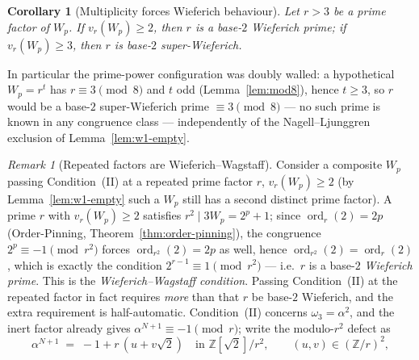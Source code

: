 \documentclass[11pt]{amsart}
\theoremstyle{plain}
\newtheorem{corollary}[theorem]{Corollary}
\theoremstyle{definition}
\theoremstyle{remark}
\newtheorem{remark}[theorem]{Remark}
\numberwithin{equation}{section}
\newcommand{\ord}{\operatorname{ord}}
\newcommand{\Z}{\mathbb{Z}}
\begin{document}
\begin{corollary}[Multiplicity forces Wieferich behaviour]\label{cor:multiplicity-wieferich}
Let $r > 3$ be a prime factor of $W_p$. If $v_r(W_p) \geq 2$, then $r$ is a base-$2$ Wieferich prime; if $v_r(W_p) \geq 3$, then $r$ is base-$2$ super-Wieferich.
\end{corollary}

In particular the prime-power configuration was doubly walled: a hypothetical $W_p = r^t$ has $r \equiv 3 \pmod 8$ and $t$ odd (Lemma~\ref{lem:mod8}), hence $t \geq 3$, so $r$ would be a base-$2$ super-Wieferich prime $\equiv 3 \pmod 8$ --- no such prime is known in any congruence class --- independently of the Nagell--Ljunggren exclusion of Lemma~\ref{lem:w1-empty}.

\begin{remark}[Repeated factors are Wieferich--Wagstaff]\label{rem:wieferich}
Consider a composite $W_p$ passing Condition~(II) at a repeated prime factor $r$, $v_r(W_p) \geq 2$ (by Lemma~\ref{lem:w1-empty} such a $W_p$ still has a second distinct prime factor). A prime $r$ with $v_r(W_p) \geq 2$ satisfies $r^2 \mid 3 W_p = 2^p + 1$; since $\ord_r(2) = 2 p$ (Order-Pinning, Theorem~\ref{thm:order-pinning}), the congruence $2^p \equiv -1 \pmod{r^2}$ forces $\ord_{r^2}(2) = 2 p$ as well, hence $\ord_{r^2}(2) = \ord_r(2)$, which is exactly the condition $2^{r-1} \equiv 1 \pmod{r^2}$ --- i.e.\ $r$ is a base-$2$ \emph{Wieferich prime}. This is the \emph{Wieferich--Wagstaff condition}. Passing Condition~(II) at the repeated factor in fact requires \emph{more} than that $r$ be base-$2$ Wieferich, and the extra requirement is half-automatic. Condition~(II) concerns $\omega_3 = \alpha^2$, and the inert factor already gives $\alpha^{N+1} \equiv -1 \pmod r$; write the modulo-$r^2$ defect as
\[
  \alpha^{N+1} \;=\; -1 + r\,(u + v\sqrt 2) \quad\text{in } \Z[\sqrt 2]/r^2, \qquad (u, v) \in (\Z/r)^2,
\]

\end{remark}
\end{document}
